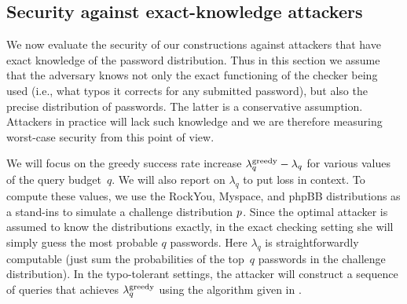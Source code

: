 \subsection{Security against exact-knowledge attackers}


We now evaluate the security of our constructions against attackers that have
exact knowledge of the password distribution.  
Thus in this section we assume that the adversary knows not only the exact
functioning of the checker being used (i.e., what typos it corrects for any
submitted password),
but also the precise distribution of
passwords. The latter is a conservative assumption. Attackers in
practice will lack such knowledge and we are therefore measuring worst-case
security from this point of view.

We will focus on the greedy success rate increase
$\lambda^\textnormal{greedy}_q - \lambda_q$ for various values of the query
budget~$q$.  %
We will also report on $\lambda_q$ to put loss in context.
To compute these values, we use the RockYou, Myspace, and phpBB
distributions as a stand-ins to simulate a challenge distribution
$p$.  Since the optimal attacker is assumed to know the
distributions exactly, in the exact checking setting she will simply
guess the most probable $q$ passwords. Here $\lambda_q$ is
straightforwardly computable (just sum the probabilities of the
top~$q$ passwords in the challenge distribution).  In the
typo-tolerant settings, the attacker will construct a sequence of
queries that achieves $\lambda^\textnormal{greedy}_q$ using the algorithm given in
.


